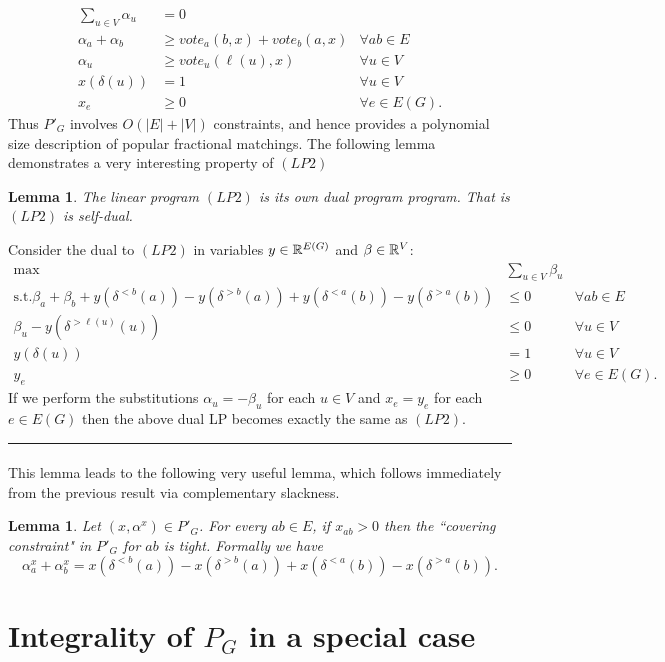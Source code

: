 \documentclass[letterpaper,12pt,oneside,onecolumn]{article}
\newenvironment{proof}{{\bf Proof:  }}{\hfill\rule{2mm}{2mm}}
\newtheorem{lemma}[fact]{Lemma}
\begin{document}
\begin{align*}
\sum_{u \in V} \alpha_u &= 0\\
\alpha_a + \alpha_b &\geq vote_a(b,x) + vote_b(a,x) &\forall ab \in E \\
\alpha_u &\geq vote_u(\ell(u),x) &\forall u \in V \\
x(\delta(u)) &= 1 &\forall u \in V \\
x_e &\geq 0 &\forall e \in E(G).
\end{align*}
Thus $P'_G$ involves $O(|E| + |V|)$ constraints, and hence provides a polynomial size description of popular fractional matchings. The following lemma demonstrates a very interesting property of $(LP2)$
\begin{lemma}\label{lemma:self-dual}
The linear program $(LP2)$ is its own dual program program. That is $(LP2)$ is self-dual.
\end{lemma}
\begin{proof}
Consider the dual to $(LP2)$ in variables $y \in \mathbb{R}^{E(G)}$ and $\beta \in \mathbb{R}^V$:
\begin{align*}
\max\ &\sum_{u \in V} \beta_u \\
\text{s.t.} \beta_a + \beta_b + y(\delta^{<b}(a))  - y(\delta^{>b}(a)) + y(\delta^{<a}(b)) - y(\delta^{>a}(b)) &\leq 0 &\forall ab \in E \\
\beta_u - y(\delta^{>\ell(u)}(u)) &\leq 0 &\forall u \in V \\
y(\delta(u)) &= 1 &\forall u \in V \\
y_e &\geq 0 &\forall e \in E(G).
\end{align*}
If we perform the substitutions $\alpha_u = -\beta_u$ for each $u \in V$ and $x_e = y_e$ for each $e \in E(G)$ then the above dual LP becomes exactly the same as $(LP2)$.
\end{proof}
\paragraph{}
This lemma leads to the following very useful lemma, which follows immediately from the previous result via complementary slackness.
\begin{lemma}\label{lemma:self-dual-cs}
Let $(x, \alpha^x) \in P'_G$.  For every $ab \in E$, if $x_{ab} > 0$ then the ``covering constraint" in $P'_G$ for $ab$ is tight. Formally we have
$$\alpha_a^x + \alpha_b^x = x(\delta^{<b}(a)) - x(\delta^{>b}(a)) + x(\delta^{<a}(b)) - x(\delta^{>a}(b)).$$
\end{lemma}
\section{Integrality of $P_G$ in a special case}\label{sec:special}
\end{document}
